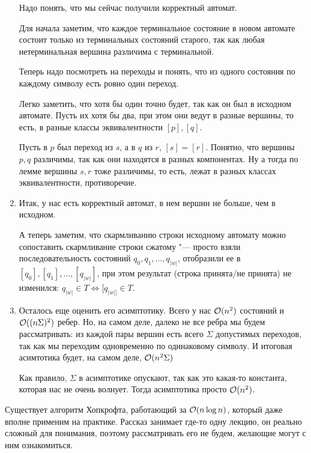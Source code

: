 \begin{enumerate}
Надо понять, что мы сейчас получили корректный автомат.

Для начала заметим, что каждое терминальное состояние в новом автомате состоит только из терминальных состояний старого, так как любая нетерминальная вершина различима с терминальной.

Теперь надо посмотреть на переходы и понять, что из одного состояния по каждому символу есть ровно один переход. 

Легко заметить, что хотя бы один точно будет, так как он был в исходном автомате. 
Пусть их хотя бы два, при этом они ведут в разные вершины, то есть, в разные классы эквивалентности $[p], [q]$. %

Пусть в $p$ был переход из $s$, а в $q$ из $r$, $[s] = [r]$. Понятно, что вершины $p, q$ различимы, так как они находятся в разных компонентах. 
Ну а тогда по лемме вершины $s, r$ тоже различимы, то есть, лежат в разных классах эквивалентности, противоречие.

\item
Итак, у нас есть корректный автомат, в нем вершин не больше, чем в исходном.

А теперь заметим, что скармливанию строки исходному автомату можно сопоставить скармливание строки сжатому "--- просто взяли последовательность состояний $q_0, q_1, \dots, q_{|w|}$, отобразили ее в 
$[q_0], [q_1], \dots, [q_{|w|}]$, при этом результат (строка принята/не принята) не изменился: $q_{|w|} \in T \iff [q_{|w|]} \in T$.

\item
Осталось еще оценить его асимптотику. Всего у нас $\mathcal{O}(n^2)$ состояний и $\mathcal{O}((n\Sigma)^2)$ ребер. 
Но, на самом деле, далеко не все ребра мы будем рассматривать: из каждой пары вершин есть всего $\Sigma$ допустимых переходов, так как мы переходим одновременно по одинаковому символу.
И итоговая асимтотика будет, на самом деле, $\mathcal{O}(n^2 \Sigma)$

Как правило, $\Sigma$ в асимптотике опускают, так как это какая-то константа, которая нас не очень волнует. Тогда асимптотика просто $\mathcal{O}(n^2)$.
\end{enumerate}
\begin{Rem}
Существует алгоритм Хопкрофта, работающий за $\mathcal{O}(n \log n)$, который даже вполне применим на практике. 
Рассказ занимает где-то одну лекцию, он реально сложный для понимания, поэтому рассматривать его не будем, желающие могут с ним ознакомиться.
\end{Rem}

